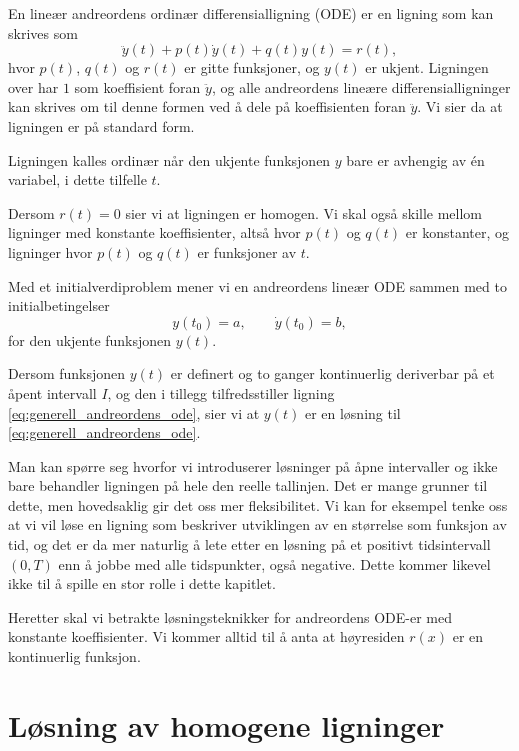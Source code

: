 \documentclass{article}
\theoremstyle{definition}
\theoremstyle{remark}
\begin{document}
\begin{multicols*}{2}
En lineær andreordens ordinær differensialligning (ODE) er en ligning som kan skrives som
\begin{equation} \label{eq:generell_andreordens_ode}
  \ddot{y}(t) + p(t) \dot{y}(t) + q(t) y(t) = r(t),
\end{equation}
hvor $p(t)$, $q(t)$ og $r(t)$ er gitte funksjoner, og $y(t)$ er ukjent. Ligningen over har $1$ som koeffisient foran $\ddot{y}$, og alle andreordens lineære differensialligninger kan skrives om til denne formen ved å dele på koeffisienten foran $\ddot{y}$. Vi sier da at ligningen er på standard form.

Ligningen kalles ordinær når den ukjente funksjonen $y$ bare er avhengig av én variabel, i dette tilfelle $t$.

Dersom $r(t) = 0$ sier vi at ligningen er homogen. Vi skal også skille mellom ligninger med konstante koeffisienter, altså hvor $p(t)$ og $q(t)$ er konstanter, og ligninger hvor $p(t)$ og $q(t)$ er funksjoner av $t$.

Med et initialverdiproblem mener vi en andreordens lineær ODE sammen med to initialbetingelser
\begin{equation*}
    y(t_0) = a, \qquad \dot{y}(t_0) = b,
\end{equation*}
for den ukjente funksjonen $y(t)$.

Dersom funksjonen $y(t)$ er definert og to ganger kontinuerlig deriverbar på et åpent intervall $I$, og den i tillegg tilfredsstiller ligning \eqref{eq:generell_andreordens_ode}, sier vi at $y(t)$ er en løsning til \eqref{eq:generell_andreordens_ode}.

Man kan spørre seg hvorfor vi introduserer løsninger på åpne intervaller og ikke bare behandler ligningen på hele den reelle tallinjen. Det er mange grunner til dette, men hovedsaklig gir det oss mer fleksibilitet. Vi kan for eksempel tenke oss at vi vil løse en ligning som beskriver utviklingen av en størrelse som funksjon av tid, og det er da mer naturlig å lete etter en løsning på et positivt tidsintervall $(0, T)$ enn å jobbe med alle tidspunkter, også negative. Dette kommer likevel ikke til å spille en stor rolle i dette kapitlet.

Heretter skal vi betrakte løsningsteknikker for andreordens ODE-er med konstante koeffisienter. Vi kommer alltid til å anta at høyresiden $r(x)$ er en kontinuerlig funksjon.


\section*{Løsning av homogene ligninger}


\end{multicols*}
\end{document}
